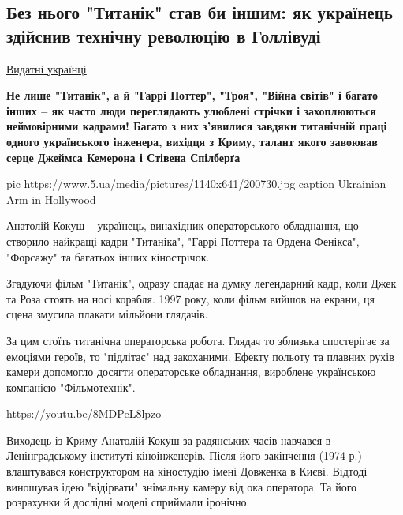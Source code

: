  
 
 

\subsection{Без нього "Титанік" став би іншим: як українець здійснив технічну революцію в Голлівуді}


\href{https://www.5.ua/spetstemy/154/}{Видатні українці}

{\bfseries
Не лише "Титанік", а й "Гаррі Поттер", "Троя", "Війна світів" і багато
інших – як часто люди переглядають улюблені стрічки і захоплюються
неймовірними кадрами! Багато з них з'явилися завдяки титанічній праці
одного українського інженера, вихідця з Криму, талант якого завоював серце
Джеймса Кемерона і Стівена Спілберґа
}

\ifcmt
pic https://www.5.ua/media/pictures/1140x641/200730.jpg
caption Ukrainian Arm in Hollywood
\fi

Анатолій Кокуш – українець, винахідник операторського обладнання, що
створило найкращі кадри "Титаніка", "Гаррі Поттера та Ордена Фенікса",
"Форсажу" та багатьох інших кінострічок.

Згадуючи фільм "Титанік", одразу спадає на думку легендарний кадр, коли
Джек та Роза стоять на носі корабля. 1997 року, коли фільм вийшов на
екрани, ця сцена змусила плакати мільйони глядачів.

За цим стоїть титанічна операторська робота. Глядач то зблизька
спостерігає за емоціями героїв, то "підлітає" над закоханими. Ефекту
польоту та плавних рухів камери допомогло досягти операторське обладнання,
вироблене українською компанією "Фільмотехнік".

\url{https://youtu.be/8MDPeL8lpzo}

Виходець із Криму Анатолій Кокуш за радянських часів навчався в
Ленінградському інституті кіноінженерів. Після його закінчення (1974 р.)
влаштувався конструктором на кіностудію імені Довженка в Києві. Відтоді
виношував ідею "відірвати" знімальну камеру від ока оператора. Та його
розрахунки й дослідні моделі сприймали іронічно.


